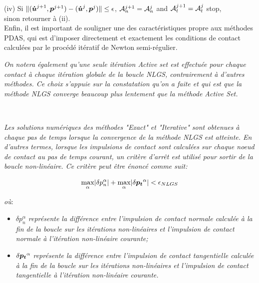 \qquad (iv) Si $\|(\boldsymbol{\dot{u}}^{j+1},\boldsymbol{p}^{j+1})-(\boldsymbol{\dot{u}}^{j},\boldsymbol{p}^{j})\|\leq\epsilon$, ${\cal A}_{n}^{j+1}={\cal A}_{n}^{j}$ and ${\cal A}_{t}^{j+1}={\cal A}_{t}^{j}$ stop,\\ sinon retourner à (ii).\\[1mm]

Enfin, il est important de souligner une des caractéristiques propre aux méthodes PDAS, qui est d'imposer directement et exactement les conditions de contact calculées par le procédé itératif de Newton semi-régulier.\\

\noindent \begin{remarque1}
\textit{On notera également qu'une seule itération Active set est effectuée pour chaque contact à chaque itération globale de la boucle NLGS, contrairement à d'autres méthodes. Ce choix s'appuie sur la constatation qu'on a faite et qui est que la méthode NLGS converge beaucoup plus lentement que la méthode Active Set.}
\end{remarque1}\\

\noindent \begin{remarque2}
\textit{Les solutions numériques des méthodes "Exact" et "Iterative" sont obtenues à chaque pas de temps lorsque la convergence de la méthode NLGS est atteinte. En d'autres termes, lorsque les impulsions de contact sont calculées
sur chaque noeud de contact au pas de temps courant, un critère d'arrêt est utilisé pour sortir de la boucle non-linéaire. Ce critère peut être énoncé comme suit:}

\begin{equation}
    \max_{\alpha}\lvert \delta p_n^{\alpha} \rvert + \max_{\alpha}\lvert \delta \boldsymbol{p_t}^{\alpha} \rvert < \epsilon_{NLGS}
\end{equation}

\noindent \textit{où}:

\begin{itemize}
    \item $\delta p_n^{\alpha}$ \textit{représente la différence entre l'impulsion de contact normale calculée à la fin de la boucle sur les itérations non-linéaires et l'impulsion de contact normale à l'itération non-linéaire courante;}
    \item $\delta \boldsymbol{p_t}^{\alpha}$ \textit{représente la différence entre l'impulsion de contact tangentielle calculée à la fin de la boucle sur les itérations non-linéaires et l'impulsion de contact tangentielle à l'itération non-linéaire courante.}
\end{itemize}
\end{remarque2}

